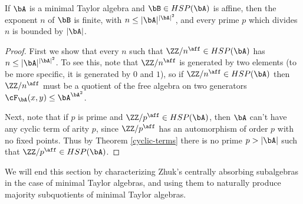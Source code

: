 \begin{prop} If $\bA$ is a minimal Taylor algebra and $\bB \in HSP(\bA)$ is affine, then the exponent $n$ of $\bB$ is finite, with $n \le |\bA|^{|\bA|^2}$, and every prime $p$ which divides $n$ is bounded by $|\bA|$.
\end{prop}
\begin{proof} First we show that every $n$ such that $\ZZ/n^{\aff} \in HSP(\bA)$ has $n \le |\bA|^{|\bA|^2}$. To see this, note that $\ZZ/n^{\aff}$ is generated by two elements (to be more specific, it is generated by $0$ and $1$), so if $\ZZ/n^{\aff} \in HSP(\bA)$ then $\ZZ/n^{\aff}$ must be a quotient of the free algebra on two generators $\cF_\bA(x,y) \le \bA^{\bA^2}$.

Next, note that if $p$ is prime and $\ZZ/p^{\aff} \in HSP(\bA)$, then $\bA$ can't have any cyclic term of arity $p$, since $\ZZ/p^{\aff}$ has an automorphism of order $p$ with no fixed points. Thus by Theorem \ref{cyclic-terms} there is no prime $p > |\bA|$ such that $\ZZ/p^{\aff} \in HSP(\bA)$.
\end{proof}

We will end this section by characterizing Zhuk's centrally absorbing subalgebras in the case of minimal Taylor algebras, and using them to naturally produce majority subquotients of minimal Taylor algebras.

